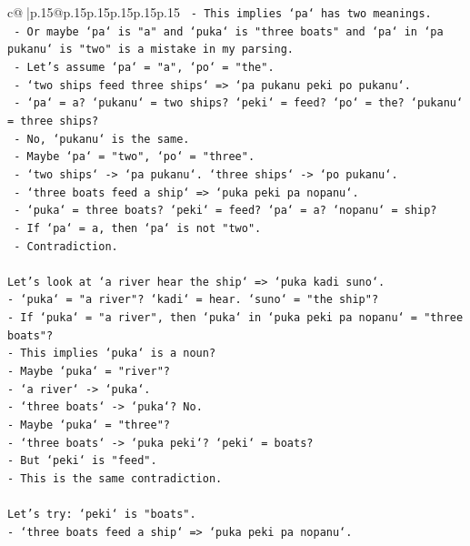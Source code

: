 \documentclass{article}
\begin{document}
{\begin{supertabular}{c@{$\;$}|p{.15\linewidth}@{}p{.15\linewidth}p{.15\linewidth}p{.15\linewidth}p{.15\linewidth}p{.15\linewidth}}
{{{\texttt{  {-} This implies `pa` has two meanings.} \\
\texttt{  {-} Or maybe `pa` is "a" and `puka` is "three boats" and `pa` in `pa pukanu` is "two" is a mistake in my parsing.} \\
\texttt{  {-} Let's assume `pa` = "a", `po` = "the".} \\
\texttt{  {-} `two ships feed three ships` => `pa pukanu peki po pukanu`.} \\
\texttt{    {-} `pa` = a? `pukanu` = two ships? `peki` = feed? `po` = the? `pukanu` = three ships?} \\
\texttt{    {-} No, `pukanu` is the same.} \\
\texttt{  {-} Maybe `pa` = "two", `po` = "three".} \\
\texttt{  {-} `two ships` {-}> `pa pukanu`. `three ships` {-}> `po pukanu`.} \\
\texttt{  {-} `three boats feed a ship` => `puka peki pa nopanu`.} \\
\texttt{    {-} `puka` = three boats? `peki` = feed? `pa` = a? `nopanu` = ship?} \\
\texttt{    {-} If `pa` = a, then `pa` is not "two".} \\
\texttt{    {-} Contradiction.} \\
\\ 
\texttt{Let's look at `a river hear the ship` => `puka kadi suno`.} \\
\texttt{{-} `puka` = "a river"? `kadi` = hear. `suno` = "the ship"?} \\
\texttt{{-} If `puka` = "a river", then `puka` in `puka peki pa nopanu` = "three boats"?} \\
\texttt{{-} This implies `puka` is a noun?} \\
\texttt{{-} Maybe `puka` = "river"?} \\
\texttt{{-} `a river` {-}> `puka`.} \\
\texttt{{-} `three boats` {-}> `puka`? No.} \\
\texttt{{-} Maybe `puka` = "three"?} \\
\texttt{{-} `three boats` {-}> `puka peki`? `peki` = boats?} \\
\texttt{{-} But `peki` is "feed".} \\
\texttt{{-} This is the same contradiction.} \\
\\ 
\texttt{Let's try: `peki` is "boats".} \\
\texttt{{-} `three boats feed a ship` => `puka peki pa nopanu`.} \\
}}}
\end{supertabular}}
\end{document}
